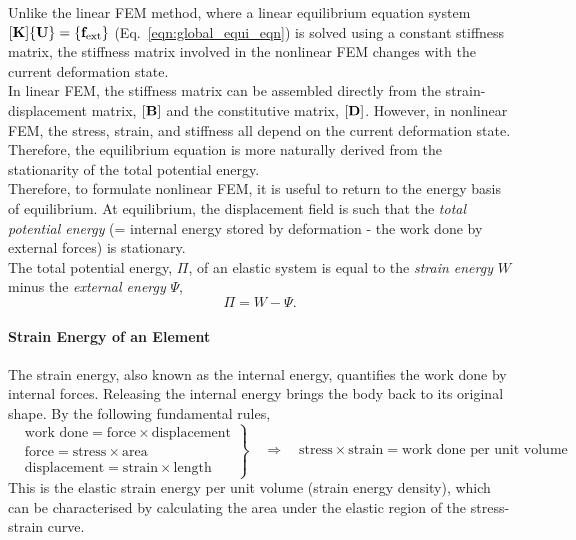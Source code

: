 \documentclass[12pt, a4paper]{article}
\numberwithin{equation}{section}
\begin{document}
Unlike the linear FEM method, where a linear equilibrium equation system $[\mathbf{K}] \{\mathbf{U}\} = \{\mathbf{f}_{\mathrm{ext}}\}$ (Eq.~\eqref{eqn:global_equi_eqn}) is solved using a constant stiffness matrix, the stiffness matrix involved in the nonlinear FEM changes with the current deformation state.\\

In linear FEM, the stiffness matrix can be assembled directly from the strain-displacement matrix, $[\mathbf{B}]$ and the constitutive matrix, $[\mathbf{D}]$. However, in nonlinear FEM, the stress, strain, and stiffness all depend on the current deformation state. Therefore, the equilibrium equation is more naturally derived from the stationarity of the total potential energy. \\

Therefore, to formulate nonlinear FEM, it is useful to return to the energy basis of equilibrium. At equilibrium, the displacement field is such that the \textit{total potential energy} (= internal energy stored by deformation - the work done by external forces) is stationary. \\

The total potential energy, $\Pi$, of an elastic system is equal to the \textit{strain energy} $W$ minus the \textit{external energy} $\Psi$,
\begin{equation}
    \Pi = W - \Psi.
\end{equation}

\paragraph{Strain Energy of an Element}
The strain energy, also known as the internal energy, quantifies the work done by internal forces. Releasing the internal energy brings the body back to its original shape. By the following fundamental rules, 
\[
    \left.
    \begin{split}
    & \text{work done} = \text{force} \times \text{displacement} \\
    & \text{force} = \text{stress} \times \text{area} \\
    & \text{displacement} = \text{strain} \times \text{length}
    \end{split}
    \right\}
    \quad \Rightarrow \quad 
    \boxed{
    \text{stress} \times \text{strain} = \text{work done per unit volume}
    }
\]
This is the elastic strain energy per unit volume (strain energy density), which can be characterised by calculating the area under the elastic region of the stress-strain curve. \\
\end{document}
